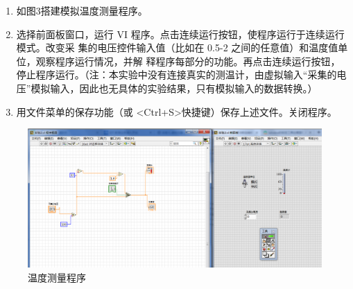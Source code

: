 \documentclass[UTF8]{article}
\begin{document}
\begin{enumerate}
    \item 如图3搭建模拟温度测量程序。
    \item 选择前面板窗口，运行 VI 程序。点击连续运行按钮，使程序运行于连续运行模式。改变采
    集的电压控件输入值（比如在 0.5-2 之间的任意值）和温度值单位，观察程序运行情况，并解
    释程序每部分的功能。再点击连续运行按钮，停止程序运行。（注：本实验中没有连接真实的测温计，由虚拟输入“采集的电压”模拟输入，因此也无具体的实验结果，只有模拟输入的数据转换。）
    \item 用文件菜单的保存功能（或 <Ctrl+S>快捷键）保存上述文件。关闭程序。
\end{enumerate}
\begin{figure}[H]
    \centering
    \includegraphics[width=17cm]{Fig/3.png}
    \caption{温度测量程序}
\end{figure}
\end{document}
